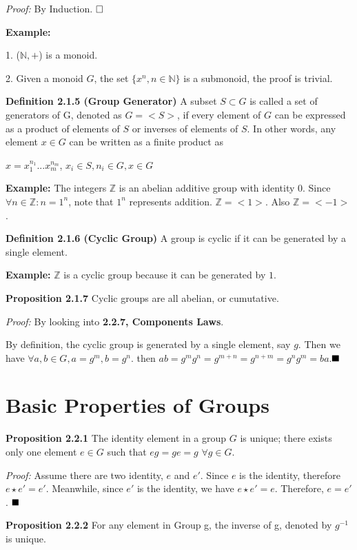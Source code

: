 \documentclass[12pt,openany]{book}
\theoremstyle{definition}
\theoremstyle{definition}
\begin{document}
\textit{Proof:} By Induction. $\hfill \square$

\noindent\textbf{Example:}

1. ($\mathbb{N},+$) is a monoid.

2. Given a monoid $G$, the set ${\{x^{n}, n \in \mathbb{N} \}}$ is a submonoid, the proof is trivial.

\noindent\textbf{Definition 2.1.5 (Group Generator)} A subset $S \subset G$ is called a set of generators of G, denoted as $G=<S>$, if every element of $G$ can be expressed as a product of elements of $S$ or inverses of elements of $S$. In other words, any element $x \in G$ can be written as a finite product as 

$x = x_{1}^{n_{1}}...x_{m}^{n_{m}}$, $x_{i} \in S, n_{i} \in G, x \in G$

\noindent\textbf{Example:} The integers $\mathbb{Z}$ is an abelian additive group with identity 0. Since $\forall n \in \mathbb{Z}: n=1^{n}$, note that $1^{n}$ represents addition. $\mathbb{Z}=<1>$. Also $\mathbb{Z}=<-1>$.

\noindent\textbf{Definition 2.1.6 (Cyclic Group)} A group is cyclic if it can be generated by a single element.

\noindent\textbf{Example:} $\mathbb{Z}$ is a cyclic group because it can be generated by $1$.

\noindent\textbf{Proposition 2.1.7} Cyclic groups are all abelian, or cumutative.

\textit{Proof:} By looking into \textbf{2.2.7, Components Laws}. 

By definition, the cyclic group is generated by a single element, say $g$. Then we have $\forall a, b \in G, a=g^{m}, b=g^{n}$. then $ab = g^{m}g^{n} = g^{m+n} = g^{n+m} = g^ng^m = ba$.$\hfill \blacksquare$

\section{Basic Properties of Groups}

\textbf{Proposition 2.2.1} The identity element in a group $G$ is unique; there exists only one element $e \in G$ such that $eg = ge = g $ $\forall g \in G$.

\textit{Proof:} Assume there are two identity, $e $ and $ e'$. Since $e$ is the identity, therefore $e\star e' = e'$. Meanwhile, since $e'$ is the identity, we have $e \star e' = e$. Therefore, $e = e'$. $\hfill\blacksquare$

\noindent \textbf{Proposition 2.2.2} For any element in Group g, the inverse of g, denoted by $g^{-1}$ is unique.
\end{document}
